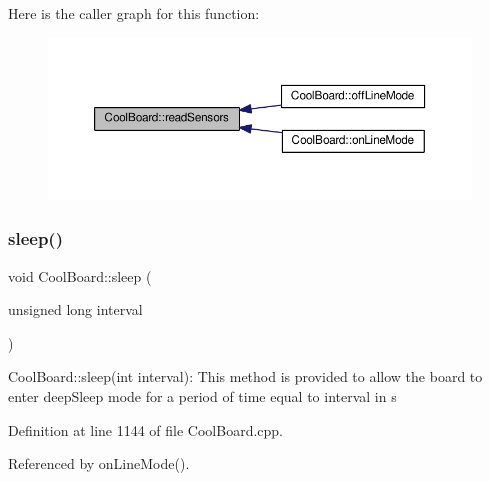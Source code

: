 Here is the caller graph for this function\+:
\nopagebreak
\begin{figure}[H]
\begin{center}
\leavevmode
\includegraphics[width=350pt]{classCoolBoard_ad03abdce2e65f520bbf2cff0f2d083cf_icgraph}
\end{center}
\end{figure}
\mbox{\label{classCoolBoard_a069952cdcb2e7f68518aa429eceadb6e}} 
\subsubsection{\texorpdfstring{sleep()}{sleep()}}
{\footnotesize\ttfamily void Cool\+Board\+::sleep (\begin{DoxyParamCaption}\item[{unsigned long}]{interval }\end{DoxyParamCaption})}

Cool\+Board\+::sleep(int interval)\+: This method is provided to allow the board to enter deep\+Sleep mode for a period of time equal to interval in s 

Definition at line 1144 of file Cool\+Board.\+cpp.



Referenced by on\+Line\+Mode().


